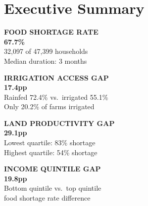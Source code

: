 \documentclass[11pt,a4paper]{article}
\begin{document}
\setcounter{page}{2}

\section{Executive Summary}

\noindent%
\begin{minipage}[t]{0.475\linewidth}
\begin{kpibox}
{\footnotesize\bfseries\color{rhoGray}FOOD SHORTAGE RATE}\\[5pt]
{\fontsize{26}{30}\selectfont\bfseries\color{rhoRed}67.7\%}\\[4pt]
{\small\color{rhoCharcoal}32,097 of 47,399 households\\
Median duration: 3 months}
\end{kpibox}
\end{minipage}\hfill%
\begin{minipage}[t]{0.475\linewidth}
\begin{kpibox}
{\footnotesize\bfseries\color{rhoGray}IRRIGATION ACCESS GAP}\\[5pt]
{\fontsize{26}{30}\selectfont\bfseries\color{rhoRed}17.4pp}\\[4pt]
{\small\color{rhoCharcoal}Rainfed 72.4\% vs.\ irrigated 55.1\%\\
Only 20.2\% of farms irrigated}
\end{kpibox}
\end{minipage}

\vspace{5pt}

\noindent%
\begin{minipage}[t]{0.475\linewidth}
\begin{kpibox}
{\footnotesize\bfseries\color{rhoGray}LAND PRODUCTIVITY GAP}\\[5pt]
{\fontsize{26}{30}\selectfont\bfseries\color{rhoRed}29.1pp}\\[4pt]
{\small\color{rhoCharcoal}Lowest quartile: 83\% shortage\\
Highest quartile: 54\% shortage}
\end{kpibox}
\end{minipage}\hfill%
\begin{minipage}[t]{0.475\linewidth}
\begin{kpibox}
{\footnotesize\bfseries\color{rhoGray}INCOME QUINTILE GAP}\\[5pt]
{\fontsize{26}{30}\selectfont\bfseries\color{rhoRed}19.8pp}\\[4pt]
{\small\color{rhoCharcoal}Bottom quintile vs.\ top quintile\\
food shortage rate difference}
\end{kpibox}
\end{minipage}
\end{document}
